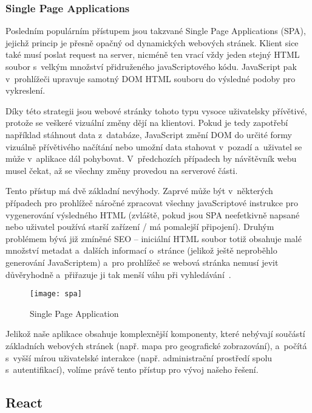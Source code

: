 \hypertarget{single-page-applications}{%
\subsubsection{Single Page Applications}\label{single-page-applications}}

Posledním populárním přístupem jsou takzvané Single Page Applications (SPA), jejichž princip je přesně opačný od dynamických webových stránek. Klient sice také musí poslat request na server, nicméně ten vrací vždy jeden stejný HTML soubor s~velkým množství přidruženého javaScriptového kódu. JavaScript pak v~prohlížeči upravuje samotný DOM HTML souboru do výsledné podoby pro vykreslení.

Díky této strategii jsou webové stránky tohoto typu vysoce uživatelsky přívětivé, protože se veškeré vizuální změny dějí na klientovi. Pokud je tedy zapotřebí například stáhnout data z~databáze, JavaScript změní DOM do určité formy vizuálně přívětivého načítání nebo umožní data stahovat v~pozadí a~uživatel se může v~aplikace dál pohybovat. V~předchozích případech by návštěvník webu musel čekat, až se všechny změny provedou na serverové části.

Tento přístup má dvě základní nevýhody. Zaprvé může být v~některých případech pro prohlížeč náročné zpracovat všechny javaScriptové instrukce pro vygenerování výsledného HTML (zvláště, pokud jsou SPA neefetkivně napsané nebo uživatel používá starší zařízení / má pomalejší připojení). Druhým problémem bývá již zmíněné SEO -- iniciální HTML soubor totiž obsahuje malé množství metadat a~dalších informací o~stránce (jelikož ještě neproběhlo generování JavaScriptem) a~pro prohlížeč se webová stránka nemusí jevit důvěryhodně a~přiřazuje ji tak menší váhu při vyhledávání~\parencite{spa}.

\begin{figure}[ht]   
    \centering
    \texttt{[image: spa]}  
    \caption{Single Page Application}
    \label{spa}
 \end{figure}

Jelikož naše aplikace obsahuje komplexnější komponenty, které nebývají součástí základních webových stránek (např. mapa pro geografické zobrazování), a~počítá s~vyšší mírou uživatelské interakce (např. administrační prostředí spolu s~autentifikací), volíme právě tento přístup pro vývoj našeho řešení.

\hypertarget{react}{%
\subsection{React}\label{react}}

